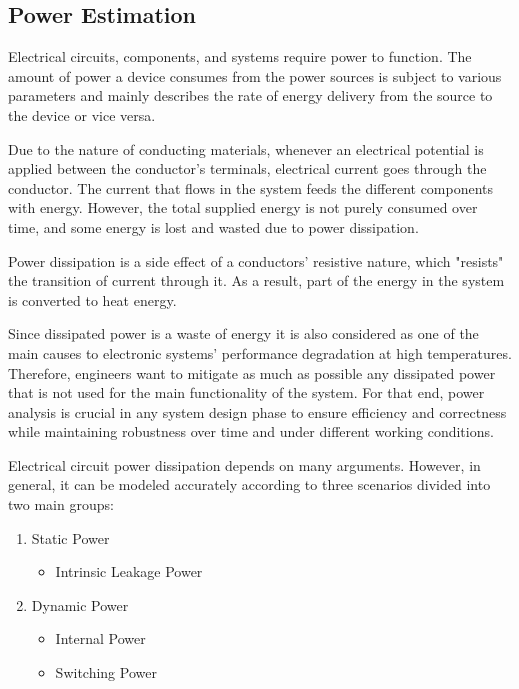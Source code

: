 \subsection{Power Estimation}
Electrical circuits, components, and systems require power to function.
The amount of power a device consumes from the power sources is subject 
to various parameters and mainly describes the rate of energy delivery 
from the source to the device or vice versa.

Due to the nature of conducting materials, 
whenever an electrical potential is applied
between the conductor's terminals, 
electrical current goes through the conductor.
The current that flows
in the system feeds the different components with energy. 
However, the total supplied energy is not purely consumed over time, 
and some energy is lost and wasted due to power dissipation.

Power dissipation is a side effect of a conductors' resistive nature, 
which "resists" the transition of current through it.
As a result, part of the energy in the system is converted 
to heat energy.

Since dissipated power is a waste of energy it is also 
considered as one of the main causes 
to electronic systems' performance degradation at high temperatures.
Therefore, engineers want to mitigate 
as much as possible any dissipated power that
is not used for the main functionality of the system. %
For that end, power analysis is crucial in any system 
design phase to ensure efficiency and correctness while maintaining 
robustness over time and under different working conditions.

Electrical circuit power dissipation depends on many arguments. %
However, in general, it can be modeled 
accurately according to three scenarios divided into two main groups:
\begin{enumerate}
    \item Static Power
    \begin{itemize}
        \item Intrinsic Leakage Power
    \end{itemize}
    \item Dynamic Power
    \begin{itemize}
        \item Internal Power
        \item Switching Power
    \end{itemize}
\end{enumerate}

